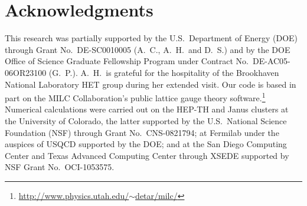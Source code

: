 \documentclass{PoS}
\begin{document}
\section*{Acknowledgments} %
This research was partially supported by the U.S.~Department of Energy (DOE) through Grant No.~DE-SC0010005 (A.~C., A.~H.\ and D.~S.) and by the DOE Office of Science Graduate Fellowship Program under Contract No.~DE-AC05-06OR23100 (G.~P.).
A.~H.\ is grateful for the hospitality of the Brookhaven National Laboratory HET group during her extended visit.
Our code is based in part on the MILC Collaboration's public lattice gauge theory software.\footnote{\href{http://www.physics.utah.edu/~detar/milc/}{http://www.physics.utah.edu/$\sim$detar/milc/}}
Numerical calculations were carried out on the HEP-TH and Janus clusters at the University of Colorado, the latter supported by the U.S.~National Science Foundation (NSF) through Grant No.~CNS-0821794; at Fermilab under the auspices of USQCD supported by the DOE; and at the San Diego Computing Center and Texas Advanced Computing Center through XSEDE supported by NSF Grant No.~OCI-1053575.





\end{document}
